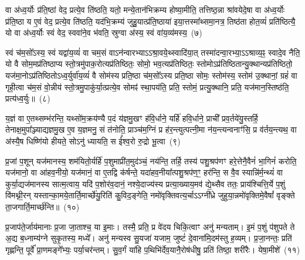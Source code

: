 वा अ॑ध्व॒र्योः प्र॑ति॒ष्ठां वेद॒ प्रत्ये॒व ति॑ष्ठति॒ यतो॒ मन्ये॒तान॑भिक्रम्य होष्या॒मीति॒ तत्तिष्ठ॒न्ना श्रा॑वयेदे॒षा वा अ॑ध्व॒र्योः प्र॑ति॒ष्ठा य ए॒वं वेद॒ प्रत्ये॒व ति॑ष्ठति॒ यद॑भि॒क्रम्य॑ जुहु॒यात्प्र॑ति॒ष्ठाया॑ इया॒त्तस्मा᳚थ्समा॒नत्र॒ तिष्ठ॑ता होत॒व्यं॑ प्रति॑ष्ठित्यै॒ यो वा अ॑ध्व॒र्योः स्वं वेद॒ स्ववा॑ने॒व भ॑वति॒ स्रुग्वा अ॑स्य॒ स्वं वा॑य॒व्य॑मस्य॒~(७)\ip

स्वं च॑म॒सो᳚\-ऽस्य॒ स्वं यद्वा॑य॒व्यं॑ वा चम॒सं वा\-ऽन॑न्वारभ्या\-ऽऽ\-श्रा॒वये॒थ्\-स्वादि॑या॒त् तस्मा॑दन्वा॒रभ्या॒\-ऽऽ\-श्राव्य॒ꣴ॒ स्वादे॒व नैति॒ यो वै सोम॒मप्र॑तिष्ठाप्य स्तो॒त्रमु॑पाक॒रोत्यप्र॑तिष्ठितः॒ सोमो॒ भव॒त्यप्र॑तिष्ठितः॒ स्तोमो\-ऽप्र॑तिष्ठितान्यु॒क्थान्यप्र॑तिष्ठितो॒ यज॑मा॒नो\-ऽप्र॑तिष्ठितो\-ऽध्व॒र्युर्वा॑य॒व्यं॑ वै सोम॑स्य प्रति॒ष्ठा च॑म॒सो᳚\-ऽस्य प्रति॒ष्ठा सोमः॒ स्तोम॑स्य॒ स्तोम॑ उ॒क्थानां॒ ग्रहं॑ वा गृही॒त्वा च॑म॒सं वो॒न्नीय॑ स्तो॒त्रमु॒पाकु॑र्या॒त्प्रत्ये॒व सोमꣴ॑ स्था॒पय॑ति॒ प्रति॒ स्तोमं॒ प्रत्यु॒क्थानि॒ प्रति॒ यज॑मान॒स्तिष्ठ॑ति॒ प्रत्य॑ध्व॒र्युः॥~(८)\ip

{\anuvakamend[{ए॒व ति॑ष्ठति॒ यो वा॑य॒व्य॑मस्य॒ ग्रहं॒ वैका॒न्नविꣳ॑श॒तिश्च॑}]}

य॒ज्ञं वा ए॒तथ्सम्भ॑रन्ति॒ यथ्सो॑म॒क्रय॑ण्यै प॒दं य॑ज्ञमु॒खꣳ ह॑वि॒र्धाने॒ यर्\mbox{}हि॑ हवि॒र्धाने॒ प्राची᳚ प्रव॒र्तये॑यु॒स्तर्\mbox{}हि॒ तेनाक्ष॒मुपा᳚ञ्ज्याद्यज्ञ\-मु॒ख ए॒व य॒ज्ञमनु॒ सं त॑नोति॒ प्राञ्च॑म॒ग्निं प्र ह॑र॒न्त्युत्पत्नी॒मा न॑य॒न्त्यन्वनाꣳ॑सि॒ प्र व॑र्तय॒न्त्यथ॒ वा अ॑स्यै॒ष धिष्णि॑यो हीयते॒ सो\-ऽनु॑ ध्यायति॒ स ई᳚श्व॒रो रु॒द्रो भू॒त्वा~(९)\ip

प्र॒जां प॒शून् यज॑मानस्य॒ शम॑यितो॒र्यर्\mbox{}हि॑ प॒शुमाप्री॑त॒मुद॑ञ्चं॒ नय॑न्ति॒ तर्\mbox{}हि॒ तस्य॑ पशु॒श्रप॑णꣳ हरे॒त्तेनै॒वैनं॑ भा॒गिनं॑ करोति॒ यज॑मानो॒ वा आ॑हव॒नीयो॒ यज॑मानं॒ वा ए॒तद्वि क॑र्\mbox{}षन्ते॒ यदा॑हव॒नीया᳚त्पशु॒श्रप॑ण॒ꣳ॒ हर॑न्ति॒ स वै॒व स्यान्नि॑र्म॒न्थ्यं॑ वा कुर्या॒द्यज॑मानस्य सात्म॒त्वाय॒ यदि॑ प॒शोर॑व॒दानं॒ नश्ये॒दाज्य॑स्य प्रत्या॒ख्याय॒मव॑ द्ये॒थ्सैव ततः॒ प्राय॑श्चित्ति॒र्ये प॒शुं वि॑मथ्नी॒रन् यस्तान्का॒मये॒तार्ति॒मार्च्छे॑यु॒रिति॑ कु॒विद॒ङ्गेति॒ नमो॑वृक्तिवत्य॒र्चा\-ऽऽ\-ग्नी᳚ध्रे जुहुया॒न्नमो॑वृक्तिमे॒वैषां᳚ वृङ्क्ते ता॒जगार्ति॒मार्च्छ॑न्ति॥~(१०)\ip

{\anuvakamend[{भू॒त्वा ततः॒ षड्विꣳ॑शतिश्च}]}

प्र॒जा\-प॑ते॒र्जाय॑मानाः प्र॒जा जा॒ताश्च॒ या इ॒माः। तस्मै॒ प्रति॒ प्र वे॑दय चिकि॒त्वाꣳ अनु॑ मन्यताम्। इ॒मं प॒शुं प॑शुपते ते अ॒द्य ब॒ध्नाम्य॑ग्ने सुकृ॒तस्य॒ मध्ये᳚। अनु॑ मन्यस्व सु॒यजा॑ यजाम॒ जुष्टं॑ दे॒वाना॑मि॒दम॑स्तु ह॒व्यम्। प्र॒जा॒नन्तः॒ प्रति॑ गृह्णन्ति॒ पूर्वे᳚ प्रा॒णमङ्गे᳚भ्यः॒ पर्या॒चर॑न्तम्। सु॒व॒र्गं या॑हि प॒थिभि॑र्देव॒यानै॒रोष॑धीषु॒ प्रति॑ तिष्ठा॒ शरी॑रैः। येषा॒मीशे॑~(११)\ip

